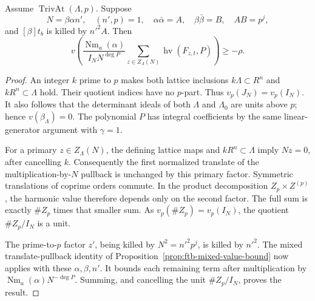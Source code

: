 \begin{srlemma}
\label{lem:ftb-level-prime-cancellation}
Assume \(\operatorname{TrivAt}(\Lambda,p)\).
Suppose
\[
 N=\beta\alpha n',\quad (n',p)=1,\quad
 \alpha\bar\alpha=A,\quad\beta\bar\beta=B,\quad AB=p^j ,
\]
and \([\beta]t_b\) is killed by \(n'^2A\).
Then
\[
 v\!\left(\frac{\operatorname{Nm}_a(\alpha)}
                     {I_N N^{\deg P}}
            \sum_{z\in Z_\Lambda(N)}
                  \operatorname{hv}(F_{z,t},P)\right)\ge-\rho .
\]
\end{srlemma}
\begin{proof}
An integer \(k\) prime to \(p\) makes both lattice inclusions
\(k\Lambda\subset R^n\) and \(kR^n\subset\Lambda\) hold.
Their quotient indices have no \(p\)-part.
Thus \(v_p(J_N)=v_p(I_N)\).
It also follows that the determinant ideals of both \(\Lambda\)
and \(\Lambda_0\) are units above \(p\); hence
\(v(\beta_\Lambda)=0\).
The polynomial \(P\) has integral coefficients by the same
linear-generator argument with \(\gamma=1\).

For a primary \(z\in Z_\Lambda(N)\), the defining lattice maps
and \(kR^n\subset\Lambda\) imply \(Nz=0\), after cancelling \(k\).
Consequently the first normalized translate of the
multiplication-by-\(N\) pullback is unchanged by this primary
factor.  Symmetric translations of coprime orders commute.
In the product decomposition \(Z_p\times Z^{(p)}\), the harmonic
value therefore depends only on the second factor.
The full sum is exactly \(\#Z_p\) times that smaller sum.
As \(v_p(\#Z_p)=v_p(I_N)\), the quotient \(\#Z_p/I_N\) is a unit.

The prime-to-\(p\) factor \(z'\), being killed by \(N^2=n'^2p^j\),
is killed by \(n'^2\).
The mixed translate-pullback identity of
Proposition~\ref{prop:ftb-mixed-value-bound} now applies with these
\(\alpha,\beta,n'\).
It bounds each remaining term after multiplication by
\(\operatorname{Nm}_a(\alpha)N^{-\deg P}\).
Summing, and cancelling the unit \(\#Z_p/I_N\), proves the result.
\end{proof}

